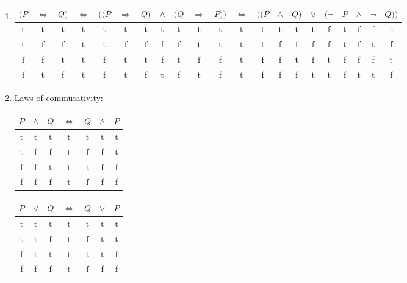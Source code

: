 \documentclass[leqno]{article}
\renewcommand{\iff}{\Leftrightarrow}
\renewcommand{\implies}{\Rightarrow}
\begin{document}
\begin{enumerate}
\item
\renewcommand{\tabcolsep}{3pt}
\begin{tabular}{ccccccccccccccccccccc}
  \hline
  $(P$ & $\iff$ & $Q)$ & $\iff$ & $((P$ & $\implies$ & $Q)$ & $\land$ & $(Q$ & $\implies$ & $P))$
                & $\iff$ & $((P$ & $\land$ & $Q)$ & $\lor$ & $(\neg$ & $P$ & $\land$ & $\neg$ & $Q))$ \\
  \hline
   t & t & t &  t & t &   t   & t &  t  & t &   t  & t  &  t &  t & t & t &  t &  f & t & f  & f & t  \\ 
   t & f & f &  t & t &   f   & f &  f  & f &   t  & t  &  t &  t & f & f &  f &  f & t & f  & t & f  \\ 
   f & f & t &  t & f &   t   & t &  f  & t &   f  & f  &  t &  f & f & t &  f &  t & f & f  & f & t  \\ 
   f & t & f &  t & f &   t   & f &  t  & f &   t  & f  &  t &  f & f & f &  t &  t & f & t  & t & f  \\ 
  \hline
\end{tabular}
\renewcommand{\tabcolsep}{6pt}

\item Laws of commutativity:

\begin{tabular}{ccccccc}
  \hline
  $P$ & $\land$ & $Q$ & $\iff$ & $Q$ & $\land$ & $P$ \\
  \hline
   t  &    t    &  t  &   t    &  t  &    t    &  t  \\
   t  &    f    &  f  &   t    &  f  &    f    &  t  \\
   f  &    f    &  t  &   t    &  t  &    f    &  f  \\
   f  &    f    &  f  &   t    &  f  &    f    &  f  \\
  \hline
\end{tabular}
\quad
\begin{tabular}{ccccccc}
  \hline
  $P$ & $\lor$ & $Q$ & $\iff$ & $Q$ & $\lor$ & $P$ \\
  \hline
   t  &    t   &  t  &   t    &  t  &    t   &  t  \\
   t  &    t   &  f  &   t    &  f  &    t   &  t  \\
   f  &    t   &  t  &   t    &  t  &    t   &  f  \\
   f  &    f   &  f  &   t    &  f  &    f   &  f  \\
  \hline
\end{tabular}


\end{enumerate}
\end{document}
